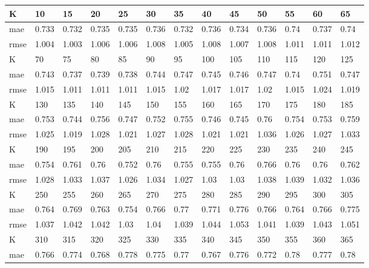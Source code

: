 \begin{appendices}
\begin{center} \label{tab9}
	\begin{tabularx}{\textwidth}{|l|X|X|X|X|X|X|X|X|X|X|X|X|} 
		\hline 
		K & 10 & 15 & 20 & 25 & 30 & 35 & 40 & 45 & 50 & 55 & 60 & 65 \\ \hline 
		mae & 0.733 & 0.732 & 0.735 & 0.735 & 0.736 & 0.732 & 0.736 & 0.734 & 0.736 & 0.74 & 0.737 & 0.74 \\ \hline 
		rmse & 1.004 & 1.003 & 1.006 & 1.006 & 1.008 & 1.005 & 1.008 & 1.007 & 1.008 & 1.011 & 1.011 & 1.012 \\ \hline 
		\hline 
		K & 70 & 75 & 80 & 85 & 90 & 95 & 100 & 105 & 110 & 115 & 120 & 125 \\ \hline 
		mae & 0.743 & 0.737 & 0.739 & 0.738 & 0.744 & 0.747 & 0.745 & 0.746 & 0.747 & 0.74 & 0.751 & 0.747 \\ \hline 
		rmse & 1.015 & 1.011 & 1.011 & 1.011 & 1.015 & 1.02 & 1.017 & 1.017 & 1.02 & 1.015 & 1.024 & 1.019 \\ \hline 
		\hline 
		K & 130 & 135 & 140 & 145 & 150 & 155 & 160 & 165 & 170 & 175 & 180 & 185 \\ \hline 
		mae & 0.753 & 0.744 & 0.756 & 0.747 & 0.752 & 0.755 & 0.746 & 0.745 & 0.76 & 0.754 & 0.753 & 0.759 \\ \hline 
		rmse & 1.025 & 1.019 & 1.028 & 1.021 & 1.027 & 1.028 & 1.021 & 1.021 & 1.036 & 1.026 & 1.027 & 1.033 \\ \hline 
		\hline 
		K & 190 & 195 & 200 & 205 & 210 & 215 & 220 & 225 & 230 & 235 & 240 & 245 \\ \hline 
		mae & 0.754 & 0.761 & 0.76 & 0.752 & 0.76 & 0.755 & 0.755 & 0.76 & 0.766 & 0.76 & 0.76 & 0.762 \\ \hline 
		rmse & 1.028 & 1.033 & 1.037 & 1.026 & 1.034 & 1.027 & 1.03 & 1.03 & 1.038 & 1.039 & 1.032 & 1.036 \\ \hline 
		\hline 
		K & 250 & 255 & 260 & 265 & 270 & 275 & 280 & 285 & 290 & 295 & 300 & 305 \\ \hline 
		mae & 0.764 & 0.769 & 0.763 & 0.754 & 0.766 & 0.77 & 0.771 & 0.776 & 0.766 & 0.764 & 0.766 & 0.775 \\ \hline 
		rmse & 1.037 & 1.042 & 1.042 & 1.03 & 1.04 & 1.039 & 1.044 & 1.053 & 1.041 & 1.039 & 1.043 & 1.051 \\ \hline 
		\hline 
		K & 310 & 315 & 320 & 325 & 330 & 335 & 340 & 345 & 350 & 355 & 360 & 365 \\ \hline 
		mae & 0.766 & 0.774 & 0.768 & 0.778 & 0.775 & 0.77 & 0.767 & 0.776 & 0.772 & 0.78 & 0.777 & 0.78 \\ \hline 

\end{tabularx}
\end{center}
\end{appendices}

